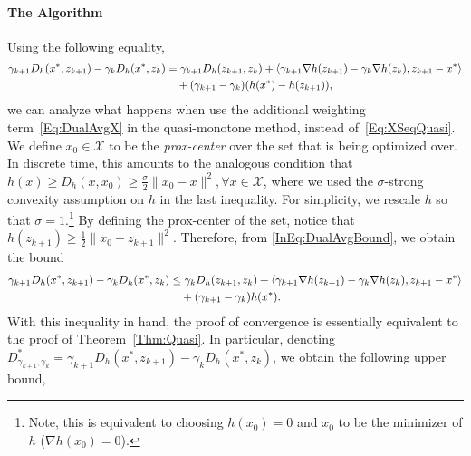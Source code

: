 \documentclass[11pt]{article}
\theoremstyle{plain}
\newcommand{\X}{{\mathcal X}}
\begin{document}
\paragraph{The Algorithm} 
Using the following equality, 
\begin{align}\label{InEq:DualAvgBound}
\gamma_{k+1} D_h(x^\ast, z_{k+1}) - \gamma_{k} D_h(x^\ast, z_k)& =\gamma_{k+1} D_h(z_{k+1}, z_k)  +  \langle \gamma_{k+1} \nabla h(z_{k+1}) - \gamma_{k} \nabla h(z_k), z_{k+1} - x^\ast \rangle \notag \\&\quad + (\gamma_{k+1} - \gamma_{k})(h(x^\ast) - h(z_{k+1})),
\end{align}
%
%
 we can analyze what happens when use the additional weighting term~\eqref{Eq:DualAvgX} in the quasi-monotone method, instead of~\eqref{Eq:XSeqQuasi}. We define $x_0 \in \X$ to be the {\em prox-center} over the set that is being optimized over. In discrete time, this amounts to the analogous condition that $h(x) \geq D_h(x ,x_0) \geq  \frac{\sigma}{2}\|x_0 - x\|^2, \forall x \in \X$, where we used the $\sigma$-strong convexity assumption on $h$ in the last inequality. For simplicity, we rescale $h$ so that $\sigma =1$.\footnote{Note, this is equivalent to choosing $h(x_0)= 0 $ and $x_0$ to be the minimizer of $h$ ($\nabla h(x_0) = 0$).} By defining the prox-center of the set, notice that $h(z_{k+1}) \geq \frac{1}{2}\|x_0 - z_{k+1}\|^2$. Therefore, from \eqref{InEq:DualAvgBound}, we obtain the bound
\begin{align}\label{Eq:DualAvgBound3}
\gamma_{k+1} D_h(x^\ast, z_{k+1}) - \gamma_k D_h(x^\ast, z_k)& \leq \gamma_k D_h(z_{k+1}, z_k)  +  \langle \gamma_{k+1} \nabla h(z_{k+1}) - \gamma_k \nabla h(z_k), z_{k+1} - x^\ast  \rangle\notag \\&\quad + (\gamma_{k+1} - \gamma_{k})h(x^\ast).
\end{align}
%
%
With this inequality in hand, the proof of convergence is essentially equivalent to the proof of Theorem~\ref{Thm:Quasi}. In particular,  denoting $D^\ast_{\gamma_{k+1}, \gamma_k} = \gamma_{k+1} D_h(x^\ast, z_{k+1}) - \gamma_{k} D_h(x^\ast, z_k)$, we obtain the following upper bound, 
\end{document}
